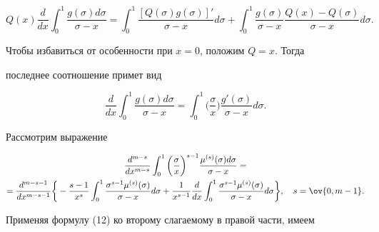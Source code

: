 $$ 


Q(x)\frac{d}{dx}\int^1_0\frac{g(\sigma)d\sigma}{\sigma-x}= 


\int^1_0\frac{[Q(\sigma)g(\sigma)]'}{\sigma-x}d\sigma+ 


\int^1_0\frac{g(\sigma)}{\sigma-x} 


\frac{Q(x)-Q(\sigma)}{\sigma-x}d\sigma. 


$$ 


 


Чтобы избавиться от особенности при $x=0$, положим $Q=x$. Тогда 


последнее соотношение примет вид 


\begin{equation} 


\frac{d}{dx}\int^1_0\frac{g(\sigma)d\sigma}{\sigma-x}= 


\int^1_0\bigg(\frac{\sigma}{x} \bigg)\frac{g'(\sigma)}{\sigma-x}d\sigma. 


\end{equation} 


Рассмотрим выражение 


\begin{multline*} 


\frac{d^{m-s}}{dx^{m-s}}\int^1_0\bigg(\frac{\sigma}{x} \bigg)^{s-1} 


\frac{\mu^{(s)}(\sigma)d\sigma}{\sigma-x}=\\ 


% 


=\frac{d^{m-s-1}}{dx^{m-s-1}}\bigg\{-\frac{s-1}{x^s} 


\int^1_0\frac{\sigma^{s-1}\mu^{(s)}(\sigma)}{\sigma-x}d\sigma+ 


\frac{1}{x^{s-1}}\frac{d}{dx}\int^1_0 


\frac{\sigma^{s-1}\mu^{(s)}(\sigma)}{\sigma-x}d\sigma\bigg\},


\quad s=\ov{0,m-1}. 


\end{multline*} 


Применяя формулу (12) ко второму слагаемому в правой части, имеем 


